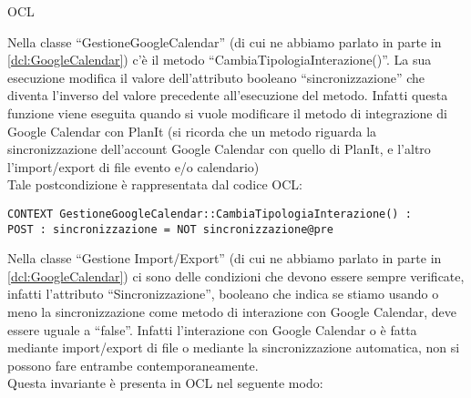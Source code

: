 \begin{listaPersonale}{OCL}
    \begin{center}
        
    \end{center}
    Nella classe “GestioneGoogleCalendar” (di cui ne abbiamo parlato in parte in \ref{dcl:GoogleCalendar}) c'è il metodo “CambiaTipologiaInterazione()”. La sua esecuzione modifica il valore dell'attributo booleano “sincronizzazione” che diventa l'inverso del valore precedente all'esecuzione del metodo. Infatti questa funzione viene eseguita quando si vuole modificare il metodo di integrazione di Google Calendar con PlanIt (si ricorda che un metodo riguarda la sincronizzazione dell'account Google Calendar con quello di PlanIt, e l'altro l'import/export di file evento e/o calendario)\\
    Tale postcondizione è rappresentata dal codice OCL:
    \begin{lstlisting}
CONTEXT GestioneGoogleCalendar::CambiaTipologiaInterazione() :
POST : sincronizzazione = NOT sincronizzazione@pre 
    \end{lstlisting}




    \begin{center}
        
    \end{center}
    Nella classe “Gestione Import/Export” (di cui ne abbiamo parlato in parte in \ref{dcl:GoogleCalendar}) ci sono delle condizioni che devono essere sempre verificate, infatti l'attributo “Sincronizzazione”, booleano che indica se stiamo usando  o meno la sincronizzazione come metodo di interazione con Google Calendar, deve essere uguale a “false”. Infatti l'interazione con Google Calendar o è fatta mediante import/export di file o mediante la sincronizzazione automatica, non si possono fare entrambe contemporaneamente.\\
    Questa invariante è presenta in OCL nel seguente modo:


\end{listaPersonale}
